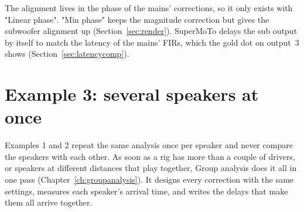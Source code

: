 \noindent The alignment lives in the phase of the mains' corrections, so it only exists with "Linear phase". "Min phase" keeps the magnitude correction but gives the subwoofer alignment up (Section~\ref{sec:render}). SuperMoTo delays the sub output by itself to match the latency of the mains' FIRs, which the gold dot on output~3 shows (Section~\ref{sec:latencycomp}).

\section{Example 3: several speakers at once}\label{sec:ex-group}

Examples 1 and 2 repeat the same analysis once per speaker and never compare the speakers with each other. As soon as a rig has more than a couple of drivers, or speakers at different distances that play together, Group analysis does it all in one pass (Chapter~\ref{ch:groupanalysis}). It designs every correction with the same settings, measures each speaker's arrival time, and writes the delays that make them all arrive together.

